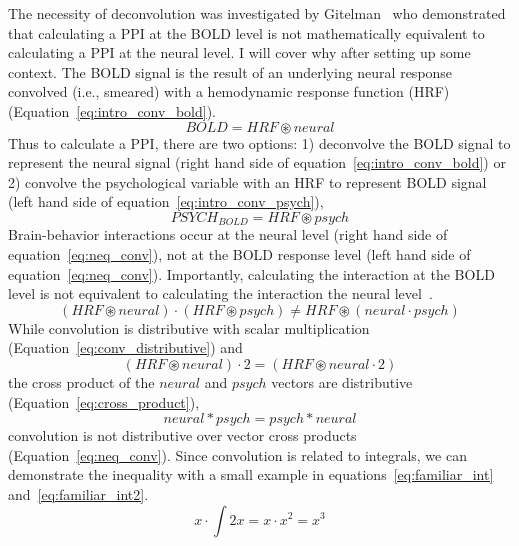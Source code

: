 \documentclass[phd,appendix,figures]{uithesis}
\begin{document}
The necessity of deconvolution was investigated by Gitelman~\cite{Gitelman2003} who demonstrated
that calculating a PPI at the BOLD level is not mathematically equivalent to calculating
a PPI at the neural level.
I will cover why after setting up some context.
The BOLD signal is the result of an underlying neural response convolved (i.e., smeared)
with a hemodynamic response function (HRF)(Equation~\ref{eq:intro_conv_bold}).
\begin{equation}
  BOLD = HRF \circledast neural
  \label{eq:intro_conv_bold}
\end{equation}
Thus to calculate a PPI, there are two options:
1) deconvolve the BOLD signal to represent the neural signal
(right hand side of equation~\ref{eq:intro_conv_bold}) or
2) convolve the psychological variable with an HRF to represent BOLD signal
(left hand side of equation~\ref{eq:intro_conv_psych}),
\begin{equation}
  PSYCH_{BOLD} = HRF \circledast psych
  \label{eq:intro_conv_psych}
\end{equation}
Brain-behavior interactions occur at the neural level
(right hand side of equation~\ref{eq:neq_conv}), not at the
BOLD response level (left hand side of equation~\ref{eq:neq_conv}).
Importantly, calculating the interaction at the BOLD level is not
equivalent to calculating the interaction the neural level~\cite{Gitelman2003}.
\begin{equation}
  (HRF \circledast neural) \cdot (HRF \circledast psych) \neq HRF \circledast (neural \cdot psych)
  \label{eq:neq_conv}
\end{equation}
While convolution is distributive with scalar multiplication (Equation~\ref{eq:conv_distributive}) and
\begin{equation}
  (HRF \circledast neural) \cdot 2 = (HRF \circledast neural \cdot 2) 
  \label{eq:conv_distributive}
\end{equation}
the cross product of the $neural$ and $psych$ vectors are distributive (Equation~\ref{eq:cross_product}),
\begin{equation}
  neural * psych = psych * neural
  \label{eq:cross_product}
\end{equation}
convolution is not distributive over vector cross products (Equation~\ref{eq:neq_conv}).
Since convolution is related to integrals,
we can demonstrate the inequality with a small example in
equations~\ref{eq:familiar_int} and~\ref{eq:familiar_int2}.
\begin{equation}
  x \cdot \int 2x = x \cdot x^2 = x^3
  \label{eq:familiar_int}
\end{equation}
\end{document}
